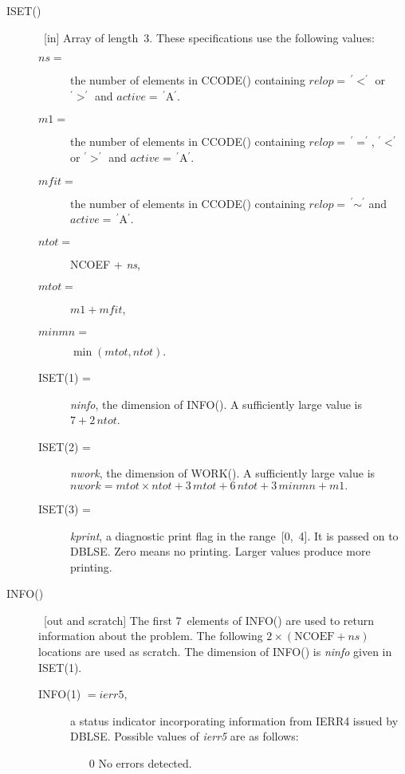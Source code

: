 \documentclass[twoside]{MATH77}
\begin{document}
\begin{description}
\item[ISET()]  \ [in] Array of length~3. These specifications use the
following values:
\begin{description}
\item[\rm $ns =$]  the number of elements in CCODE() containing $%
relop=\,^{\prime }{<}^{\prime }$ or $^{\prime }{>}^{\prime }$ and $active
=\,^{\prime }$A$^{\prime }.$

\item[\rm $m1 =$]  the number of elements in CCODE() containing $%
relop=\,^{\prime }{=}^{\prime }$, $^{\prime }{<}^{\prime }$ or $^{\prime
}{>}^{\prime }$ and $active =\,^{\prime }$A$^{\prime }.$

\item[\rm $mfit =$]  the number of elements in CCODE() containing $relop
=\,^{\prime }{\sim }^{\prime }$ and $active =\,^{\prime }$A$^{\prime }.$

\item[\rm $ntot =$]  NCOEF + {\em ns},

\item[\rm $mtot =$]  $m1+mfit$,

\item[\rm $minmn =$]  $\min (mtot,ntot).$\rule[-5pt]{0pt}{8pt}

\item[\rm ISET(1) =]  {\em ninfo}, the dimension of INFO(). A sufficiently large
value is $7+2\,ntot$.

\item[\rm ISET(2) =]  {\em nwork}, the dimension of WORK(). A sufficiently large
value is $nwork=mtot\times ntot+3\,mtot+6\,ntot+3\,minmn+m1.$

\item[\rm ISET(3) =]  {\em kprint}, a diagnostic print flag in the range~[0,~4].
It is passed on to DBLSE. Zero means no printing. Larger values produce more
printing.
\end{description}
\item[INFO()]  \ [out and scratch] The first 7~elements of INFO() are used
to return information about the problem. The following $2\times (\text{NCOEF}%
+ns)$ locations are used as scratch. The dimension of INFO() is {\em ninfo}
given in ISET(1).
\begin{description}
\item[\rm INFO(1) $= ierr5$,]  a status indicator incorporating information
from IERR4 issued by DBLSE. Possible values of {\em ierr5} are as follows:
\begin{itemize}
\item[0]  No errors detected.


\end{itemize}
\end{description}
\end{description}
\end{document}
